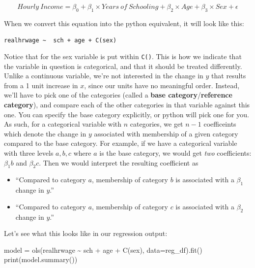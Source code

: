 \documentclass[
  letterpaper,
  DIV=11,
  numbers=noendperiod]{scrreprt}
\newenvironment{Shaded}{\begin{snugshade}}{\end{snugshade}}
\newcommand{\BuiltInTok}[1]{\textcolor[rgb]{0.00,0.23,0.31}{#1}}
\newcommand{\NormalTok}[1]{\textcolor[rgb]{0.00,0.23,0.31}{#1}}
\newcommand{\OperatorTok}[1]{\textcolor[rgb]{0.37,0.37,0.37}{#1}}
\newcommand{\StringTok}[1]{\textcolor[rgb]{0.13,0.47,0.30}{#1}}
\providecommand{\tightlist}{%
  \setlength{\itemsep}{0pt}\setlength{\parskip}{0pt}}\usepackage{longtable,booktabs,array}
\begin{document}
\[Hourly\ Income= \beta_0 + \beta_1 \times Years\ of\ Schooling + \beta_2 \times Age + \beta_3 \times Sex +\epsilon \]

When we convert this equation into the python equivalent, it will look
like this:

\texttt{realhrwage\ \textasciitilde{}\ \ sch\ +\ age\ +\ C(sex)}

Notice that for the sex variable is put within \texttt{C()}. This is how
we indicate that the variable in question is categorical, and that it
should be treated differently. Unlike a continuous variable, we're not
interested in the change in \(y\) that results from a 1 unit increase in
\(x\), since our units have no meaningful order. Instead, we'll have to
pick one of the categories (called a \textbf{base
category}/\textbf{reference category}), and compare each of the other
categories in that variable against this one. You can specify the base
category explicitly, or python will pick one for you. As such, for a
categorical variable with \(n\) categories, we get \(n-1\) coefficeints
which denote the change in \(y\) associated with membership of a given
category compared to the base category. For example, if we have a
categorical variable with three levels \(a, b, c\) where \(a\) is the
base category, we would get \emph{two} coefficients: \(\beta_1 b\) and
\(\beta_2 c\). Then we would interpret the resulting coefficient as

\begin{itemize}
\tightlist
\item
  ``Compared to category \(a\), membership of category \(b\) is
  associated with a \(\beta_1\) change in \(y\).''
\item
  ``Compared to category \(a\), membership of category \(c\) is
  associated with a \(\beta_2\) change in \(y\).''
\end{itemize}

Let's see what this looks like in our regression output:

\begin{Shaded}
\begin{Highlighting}[]
\NormalTok{model }\OperatorTok{=}\NormalTok{ ols(}\StringTok{\textquotesingle{}realhrwage \textasciitilde{}  sch + age + C(sex)\textquotesingle{}}\NormalTok{, data}\OperatorTok{=}\NormalTok{reg\_df).fit() }
\BuiltInTok{print}\NormalTok{(model.summary())}
\end{Highlighting}
\end{Shaded}
\end{document}
